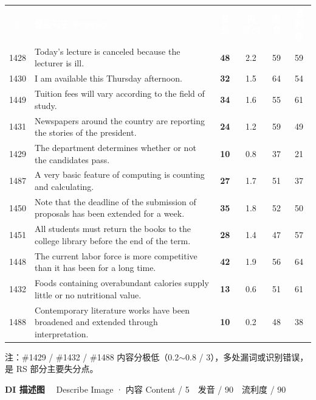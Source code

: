 \documentclass[11pt]{article}
\newcommand{\scorehead}{%
  \rowcolors{2}{cGrayBox}{white}
  \arrayrulecolor{cRule}}
\newcommand{\ptetask}[2]{%
  \needspace{4\baselineskip}\medskip
  \begin{tcolorbox}[enhanced, colback=cHead, colframe=cHead, sharp corners,
     left=12pt, right=12pt, top=5pt, bottom=5pt, boxrule=0pt]
    {\large\bfseries\color{white} #1}\ \ {\color{white!80} #2}
  \end{tcolorbox}\smallskip}
\begin{document}
{\small\scorehead
\begin{tabularx}{\linewidth}{@{}c >{\RaggedRight\arraybackslash}X c c c c@{}}
\rowcolor{cHead}
\textcolor{white}{\bfseries\#} & \textcolor{white}{\bfseries 题面句子 Sentence} &
\textcolor{white}{\bfseries 总分} & \textcolor{white}{\bfseries 内容/3} &
\textcolor{white}{\bfseries 发音} & \textcolor{white}{\bfseries 流利度}\\
1428 & Today's lecture is canceled because the lecturer is ill. & \textcolor{cAccent}{\bfseries 48} & 2.2 & 59 & 59\\
1430 & I am available this Thursday afternoon. & \textcolor{cAccent}{\bfseries 32} & 1.5 & 64 & 54\\
1449 & Tuition fees will vary according to the field of study. & \textcolor{cAccent}{\bfseries 34} & 1.6 & 55 & 61\\
1431 & Newspapers around the country are reporting the stories of the president. & \textcolor{cAccent}{\bfseries 24} & 1.2 & 59 & 49\\
1429 & The department determines whether or not the candidates pass. & \textcolor{cWrong}{\bfseries 10} & 0.8 & 37 & 21\\
1487 & A very basic feature of computing is counting and calculating. & \textcolor{cAccent}{\bfseries 27} & 1.7 & 51 & 37\\
1450 & Note that the deadline of the submission of proposals has been extended for a week. & \textcolor{cAccent}{\bfseries 35} & 1.8 & 52 & 50\\
1451 & All students must return the books to the college library before the end of the term. & \textcolor{cAccent}{\bfseries 28} & 1.4 & 47 & 57\\
1448 & The current labor force is more competitive than it has been for a long time. & \textcolor{cAccent}{\bfseries 42} & 1.9 & 56 & 64\\
1432 & Foods containing overabundant calories supply little or no nutritional value. & \textcolor{cWrong}{\bfseries 13} & 0.6 & 51 & 61\\
1488 & Contemporary literature works have been broadened and extended through interpretation. & \textcolor{cWrong}{\bfseries 10} & 0.2 & 48 & 38\\
\end{tabularx}}
\smallskip
{\footnotesize\color{gray} 注：\#1429 / \#1432 / \#1488 内容分极低（0.2$\sim$0.8 / 3），多处漏词或识别错误，是 RS 部分主要失分点。}

\ptetask{DI 描述图}{Describe Image · 内容 Content / 5　发音 / 90　流利度 / 90}
\end{document}
